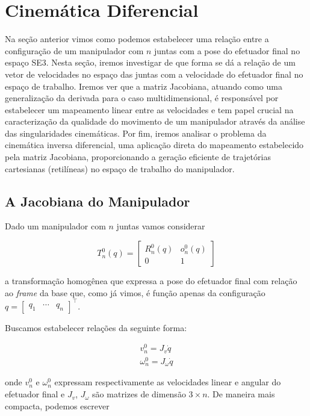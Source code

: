 \section{Cinemática Diferencial}

Na seção anterior vimos como podemos estabelecer uma relação entre a
configuração de um manipulador com $n$ juntas com a pose do efetuador final no
espaço SE3. Nesta seção, iremos investigar de que forma se dá a relação de um
vetor de velocidades no espaço das juntas com a velocidade do efetuador final
no espaço de trabalho. Iremos ver que a matriz Jacobiana, atuando como uma
generalização da derivada para o caso multidimensional, é responsável por
estabelecer um mapeamento linear entre as velocidades e tem papel crucial na
caracterização da qualidade do movimento de um manipulador através da análise
das singularidades cinemáticas. Por fim, iremos analisar o problema da
cinemática inversa diferencial, uma aplicação direta do mapeamento estabelecido
pela matriz Jacobiana, proporcionando a geração eficiente de trajetórias
cartesianas (retilíneas) no espaço de trabalho do manipulador.

\subsection{A Jacobiana do Manipulador}

Dado um manipulador com $n$ juntas vamos considerar

\begin{equation}
    T_{n}^{0}(q) = \begin{bmatrix}
        R_{n}^{0}(q) & o_{n}^{0}(q) \\
        0            & 1
    \end{bmatrix}
\end{equation}

a transformação homogênea que expressa a pose do efetuador final com relação ao
\emph{frame} da base que, como já vimos, é função apenas da configuração \(q =
\begin{bmatrix}
    q_1 & \cdots & q_n
\end{bmatrix}^\top\).

Buscamos estabelecer relações da seguinte forma:

\begin{align}
    v_n^0 = J_v \dot{q} \\
    \omega_n^0 = J_\omega \dot{q}
\end{align}

onde \(v_n^0\) e \(\omega_n^0\) expressam respectivamente as velocidades linear
e angular do efetuador final e \(J_v\), \(J_\omega\) são matrizes de dimensão
\(3 \times n\). De maneira mais compacta, podemos escrever

